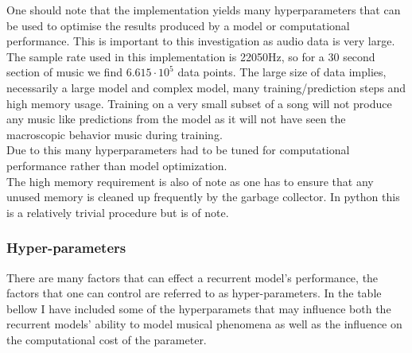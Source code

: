 \documentclass{article}
\begin{document}
One should note that the implementation yields many hyperparameters that can be used to optimise the results produced by a model or computational performance. This is important to this investigation as audio data is very large. The sample rate used in this implementation is 22050Hz, so for a 30 second section of music we find $6.615\cdot 10^{5}$ data points. The large size of data implies, necessarily a large model and complex model, many training/prediction steps and high memory usage. Training on a very small subset of a song will not produce any music like predictions from the model as it will not have seen the macroscopic behavior music during training. \\
Due to this many hyperparameters had to be tuned for computational performance rather than model optimization. \\
The high memory requirement is also of note as one has to ensure that any unused memory is cleaned up frequently by the garbage collector. In python this is a relatively trivial procedure but is of note. 

\subsubsection{Hyper-parameters}
There are many factors that can effect a recurrent model's performance, the factors that one can control are referred to as hyper-parameters. In the table bellow I have included some of the hyperparamets that may influence both the recurrent models' ability to model musical phenomena as well as the influence on the computational cost of the parameter.
\end{document}
